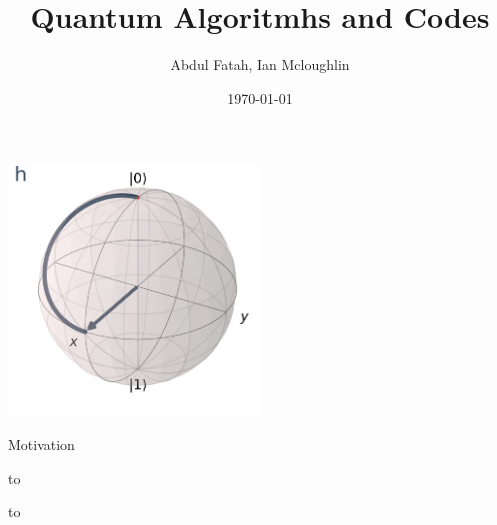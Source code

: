 \documentclass[14pt, aspectratio=169]{beamer}
\title{Quantum Algoritmhs and Codes}
\author{Abdul Fatah, Ian Mcloughlin}
\institute{ATU - Atlantic Technological University, Galway}
\date{\today}
\begin{document}
\frame{\titlepage}

\begin{frame}
  \centering
  \includegraphics[width=0.5\textwidth]{images/h-gate-bloch.png}
\end{frame}

\begin{frame}{Motivation}
  \begin{minipage}{0.4\textwidth}
    \vbox to 
\end{minipage}\hfill
\begin{minipage}{0.6\textwidth}
      \vbox to 
  \end{minipage}
  
\end{frame}
\end{document}
